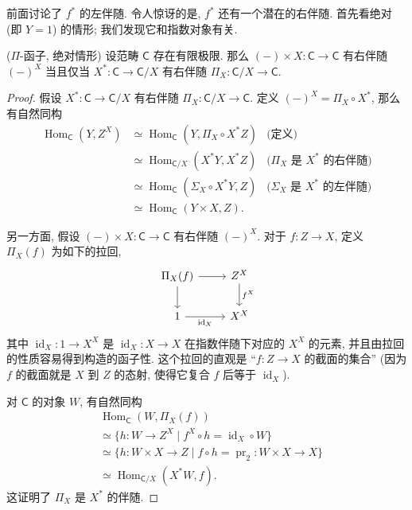 前面讨论了 $f^*$ 的左伴随. 令人惊讶的是, $f^*$ 还有一个潜在的右伴随. 首先看绝对 (即 $Y=1$) 的情形; 我们发现它和指数对象有关.

\begin{propdef}
    {($\Pi$-函子, 绝对情形)}
    设范畴 $\mathsf C$ 存在有限极限.
    那么 $(-)\times X \colon \mathsf C \to \mathsf C$ 有右伴随 $(-)^X$ 当且仅当
    $X^* \colon \mathsf C \to \mathsf C/X$ 有右伴随 $\Pi_X \colon \mathsf C/X \to \mathsf C$.
\end{propdef}

\begin{proof}
    假设 $X^* \colon \mathsf C \to \mathsf C/X$ 有右伴随 $\Pi_X \colon \mathsf C/X \to \mathsf C$. 定义 $(-)^X = \Pi_X \circ X^*$, 那么有自然同构
    \begin{align*}
        \operatorname{Hom}_{\mathsf C} (Y,Z^X)
        &\simeq\operatorname{Hom}_{\mathsf C} (Y,\Pi_X\circ X^*Z)&\text{(定义)}\\
        &\simeq\operatorname{Hom}_{\mathsf C/X} (X^*Y,X^*Z)&\text{($\Pi_X$ 是 $X^*$ 的右伴随)}\\
        &\simeq\operatorname{Hom}_{\mathsf C} (\Sigma_X\circ X^*Y,Z)&\text{($\Sigma_X$ 是 $X^*$ 的左伴随)}\\
        &\simeq\operatorname{Hom}_{\mathsf C} (Y\times X,Z).
    \end{align*}

    另一方面, 假设 $(-)\times X \colon \mathsf C \to \mathsf C$ 有右伴随 $(-)^X$.
    对于 $f\colon Z \to X$, 定义 $\Pi_X(f)$ 为如下的拉回,
    \[\begin{tikzcd}[ampersand replacement=\&]
    	{\Pi_X(f)} \& {Z^X} \\
    	1 \& {X^X}
    	\arrow["{\operatorname{id}_X}"', from=2-1, to=2-2]
    	\arrow[from=1-1, to=2-1]
    	\arrow[from=1-1, to=1-2]
    	\arrow["{f^X}", from=1-2, to=2-2]
    \end{tikzcd}\]
    其中 $\operatorname{id}_X \colon 1 \to X^X$
    是 $\operatorname{id}_X \colon X \to X$
    在指数伴随下对应的 $X^X$ 的元素,
    并且由拉回的性质容易得到构造的函子性.
    这个拉回的直观是 ``$f \colon Z \to X$ 的截面的集合'' (因为 $f$ 的截面就是 $X$ 到 $Z$ 的态射, 使得它复合 $f$ 后等于 $\operatorname{id}_X$).
    
    对 $\mathsf C$ 的对象 $W$, 有自然同构
    \begin{align*}
        &\operatorname{Hom}_{\mathsf C}(W,\Pi_X(f))
        \\&\simeq
        \big\{
        h\colon W\to Z^X \mid f^X \circ h=\operatorname{id}_X\circ W
        \big\}
        \\&\simeq
        \big\{
        h\colon W\times X \to Z \mid f \circ h = \operatorname{pr}_2 \colon W\times X \to X
        \big\}
        \\&\simeq
        \operatorname{Hom}_{\mathsf C/X}
        (X^*W,f).
    \end{align*}
    这证明了 $\Pi_X$ 是 $X^*$ 的伴随.
\end{proof}

